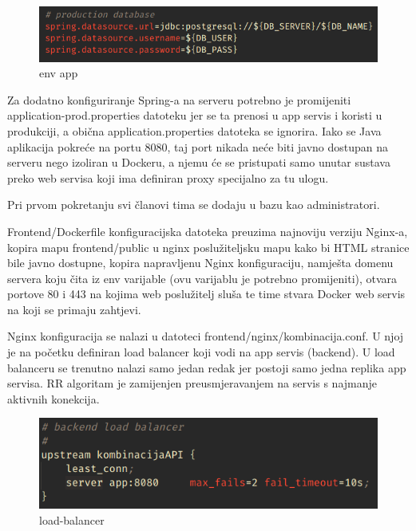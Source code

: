 		\begin{figure}[H]
					\includegraphics[scale=0.8]{figures/5-env.PNG}
					\centering
					\caption{env app}
					\label{fig:env app}
				\end{figure} 
				
		Za dodatno konfiguriranje Spring-a na serveru potrebno je promijeniti application-prod.properties datoteku jer se ta prenosi u app servis i koristi u produkciji, a obična application.properties datoteka se ignorira. 
Iako se Java aplikacija pokreće na portu 8080, taj port nikada neće biti javno dostupan na serveru nego izoliran u Dockeru, a njemu će se pristupati samo unutar sustava preko web servisa koji ima definiran proxy specijalno za tu ulogu.

		Pri prvom pokretanju svi članovi tima se dodaju u bazu kao administratori.\\
		
		
		
		Frontend/Dockerfile  konfiguracijska datoteka preuzima najnoviju verziju Nginx-a, kopira mapu frontend/public u nginx poslužiteljsku mapu kako bi HTML stranice bile javno dostupne, kopira napravljenu Nginx konfiguraciju, namješta domenu servera koju čita iz env varijable (ovu varijablu je potrebno promijeniti), otvara portove 80 i 443 na kojima web poslužitelj sluša te time stvara Docker web servis na koji se primaju zahtjevi.

		Nginx konfiguracija se nalazi u datoteci frontend/nginx/kombinacija.conf. U njoj je na početku definiran load balancer koji vodi na app servis (backend). U load balanceru se trenutno nalazi samo jedan redak jer postoji samo jedna replika app servisa. RR algoritam je zamijenjen preusmjeravanjem na servis s najmanje aktivnih konekcija.
		
		\begin{figure}[H]
					\includegraphics[scale=0.8]{figures/6-load-balancer.PNG}
					\centering
					\caption{load-balancer}
					\label{fig:load-balancer}
				\end{figure} 
		
